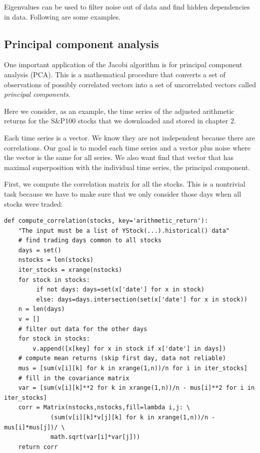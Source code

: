 \documentclass[justified,sixbynine]{tufte-book}
\def\ft{\small\tt}
\theoremstyle{plain}%
\theoremstyle{definition}
\theoremstyle{remark}
\begin{document}
\begin{fullwidth}
Eigenvalues can be used to filter noise out of data and find hidden dependencies in data. Following are some examples.

\goodbreak\subsection{Principal component analysis}


One important application of the Jacobi algorithm is for principal component analysis (PCA). This is a mathematical procedure that converts a set of observations of possibly correlated vectors into a set of uncorrelated vectors called {\it principal components}.

Here we consider, as an example, the time series of the adjusted arithmetic returns for the S\&P100 stocks that we downloaded and stored in chapter 2.

Each time series is a vector. We know they are not independent because there are correlations. Our goal is to model each time series and a vector plus noise where the vector is the same for all series. We also want find that vector that has maximal superposition with the individual time series, the principal component.

First, we compute the correlation matrix for all the stocks. This is a nontrivial task because we have to make sure that we only consider those days when all stocks were traded:

\begin{lstlisting}[caption={in file: {\ft nlib.py}}]
def compute_correlation(stocks, key='arithmetic_return'):
    "The input must be a list of YStock(...).historical() data"
    # find trading days common to all stocks
    days = set()
    nstocks = len(stocks)
    iter_stocks = xrange(nstocks)
    for stock in stocks:
         if not days: days=set(x['date'] for x in stock)
         else: days=days.intersection(set(x['date'] for x in stock))
    n = len(days)
    v = []
    # filter out data for the other days
    for stock in stocks:
        v.append([x[key] for x in stock if x['date'] in days])
    # compute mean returns (skip first day, data not reliable)
    mus = [sum(v[i][k] for k in xrange(1,n))/n for i in iter_stocks]
    # fill in the covariance matrix
    var = [sum(v[i][k]**2 for k in xrange(1,n))/n - mus[i]**2 for i in iter_stocks]
    corr = Matrix(nstocks,nstocks,fill=lambda i,j: \
             (sum(v[i][k]*v[j][k] for k in xrange(1,n))/n - mus[i]*mus[j])/ \
             math.sqrt(var[i]*var[j]))
    return corr
\end{lstlisting}


\end{fullwidth}
\end{document}
